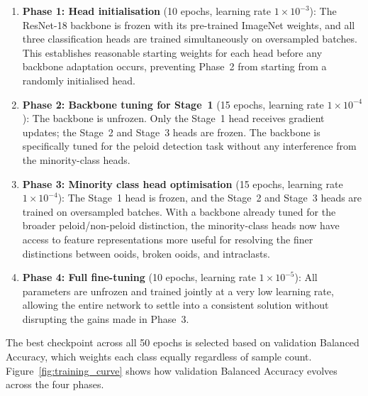 \documentclass[a4paper,fleqn]{cas-dc}
\begin{document}
\begin{enumerate}
  \item \textbf{Phase 1: Head initialisation} (10 epochs, learning rate $1\times10^{-3}$): The ResNet-18 backbone is frozen with its pre-trained ImageNet weights, and all three classification heads are trained simultaneously on oversampled batches. This establishes reasonable starting weights for each head before any backbone adaptation occurs, preventing Phase~2 from starting from a randomly initialised head.

  \item \textbf{Phase 2: Backbone tuning for Stage~1} (15 epochs, learning rate $1\times10^{-4}$): The backbone is unfrozen. Only the Stage~1 head receives gradient updates; the Stage~2 and Stage~3 heads are frozen. The backbone is specifically tuned for the peloid detection task without any interference from the minority-class heads.

  \item \textbf{Phase 3: Minority class head optimisation} (15 epochs, learning rate $1\times10^{-4}$): The Stage~1 head is frozen, and the Stage~2 and Stage~3 heads are trained on oversampled batches. With a backbone already tuned for the broader peloid/non-peloid distinction, the minority-class heads now have access to feature representations more useful for resolving the finer distinctions between ooids, broken ooids, and intraclasts.

  \item \textbf{Phase 4: Full fine-tuning} (10 epochs, learning rate $1\times10^{-5}$): All parameters are unfrozen and trained jointly at a very low learning rate, allowing the entire network to settle into a consistent solution without disrupting the gains made in Phase~3.
\end{enumerate}

The best checkpoint across all 50 epochs is selected based on validation Balanced Accuracy, which weights each class equally regardless of sample count. Figure~\ref{fig:training_curve} shows how validation Balanced Accuracy evolves across the four phases.
\end{document}

